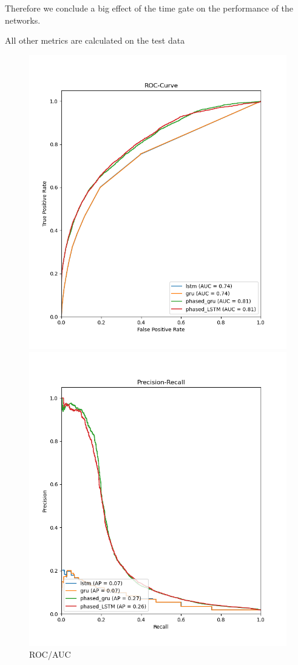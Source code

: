 Therefore we conclude a big effect of the time gate on the performance of the networks. 

All other metrics are calculated on the test data 
\begin{figure}[h]
\begin{minipage}[c]{0.5\linewidth}
\includegraphics[width=\linewidth]{images/AUC_all.png}
\caption{ROC/AUC}
\label{fig:AUC}
\end{minipage}
\hfill
\begin{minipage}[c]{0.5\linewidth}
\includegraphics[width=\linewidth]{images/PR_all.png}

\end{minipage}
\end{figure}
